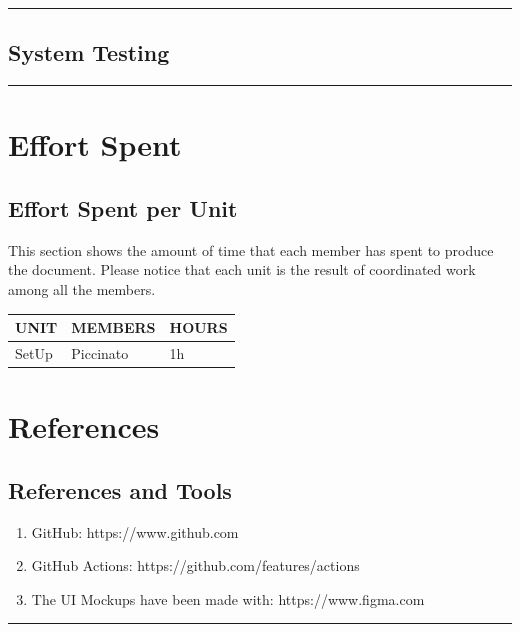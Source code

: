 \documentclass{Configuration_Files/Template}
\begin{document}
{\color{bluepoli}\rule{\linewidth}{0.1pt}}

\section{System Testing}

{\color{bluepoli}\rule{\linewidth}{0.1pt}}

\chapter{Effort Spent}

\section{Effort Spent per Unit}

This section shows the amount of time that each member has spent to produce the document. Please notice that each unit is the result of coordinated work among all the members.

\begin{table}[h]
\centering
\begin{tabularx}{\textwidth}{| X | X | X |}
\hline
\textbf{UNIT} & \textbf{MEMBERS} & \textbf{HOURS} \\ [1ex]
\hline
SetUp & Piccinato & 1h \\ [1ex]
\hline
\end{tabularx}
\end{table}

\chapter{References}

\section{References and Tools}

\begin{enumerate}
    \item GitHub: https://www.github.com
    \item GitHub Actions: https://github.com/features/actions
    \item The UI Mockups have been made with: https://www.figma.com
\end{enumerate}

{\color{bluepoli}\rule{\linewidth}{0.1pt}}
\end{document}

